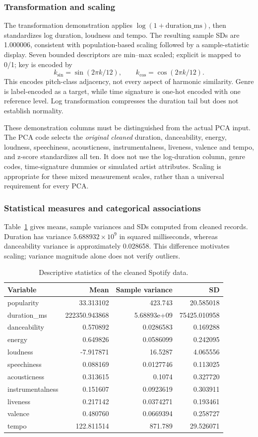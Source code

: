 \documentclass[12pt, a4paper]{article}
\begin{document}
\subsubsection{Transformation and scaling}
The transformation demonstration applies $\log(1+\mathrm{duration\_ms})$, then standardizes log duration, loudness and tempo. The resulting sample SDs are 1.000006, consistent with population-based scaling followed by a sample-statistic display. Seven bounded descriptors are min--max scaled; explicit is mapped to 0/1; key is encoded by
\[
k_{\sin}=\sin(2\pi k/12),\qquad k_{\cos}=\cos(2\pi k/12).
\]
This encodes pitch-class adjacency, not every aspect of harmonic similarity. Genre is label-encoded as a target, while time signature is one-hot encoded with one reference level. Log transformation compresses the duration tail but does not establish normality.

These demonstration columns must be distinguished from the actual PCA input. The PCA code selects the \emph{original cleaned} duration, danceability, energy, loudness, speechiness, acousticness, instrumentalness, liveness, valence and tempo, and z-score standardizes all ten. It does not use the log-duration column, genre codes, time-signature dummies or simulated artist attributes. Scaling is appropriate for these mixed measurement scales, rather than a universal requirement for every PCA.

\subsubsection{Statistical measures and categorical associations}
Table~\ref{tab:spotify-stats} gives means, sample variances and SDs computed from cleaned records. Duration has variance $5.688932\times10^9$ in squared milliseconds, whereas danceability variance is approximately 0.028658. This difference motivates scaling; variance magnitude alone does not verify outliers.
\begin{table}[htbp]
\centering\small
\setlength{\tabcolsep}{4pt}\renewcommand{\arraystretch}{1.12}
\caption{Descriptive statistics of the cleaned Spotify data.}
\label{tab:spotify-stats}
\begin{tabular}{lrrr}
\toprule
\textbf{Variable} & \textbf{Mean} & \textbf{Sample variance} & \textbf{SD} \tabularnewline
\midrule
popularity & 33.313102 & 423.743 & 20.585018 \tabularnewline
duration\_ms & 222350.943868 & 5.68893e+09 & 75425.010958 \tabularnewline
danceability & 0.570892 & 0.0286583 & 0.169288 \tabularnewline
energy & 0.649826 & 0.0586099 & 0.242095 \tabularnewline
loudness & -7.917871 & 16.5287 & 4.065556 \tabularnewline
speechiness & 0.088169 & 0.0127746 & 0.113025 \tabularnewline
acousticness & 0.313615 & 0.1074 & 0.327720 \tabularnewline
instrumentalness & 0.151607 & 0.0923619 & 0.303911 \tabularnewline
liveness & 0.217142 & 0.0374271 & 0.193461 \tabularnewline
valence & 0.480760 & 0.0669394 & 0.258727 \tabularnewline
tempo & 122.811514 & 871.789 & 29.526071 \tabularnewline
\bottomrule
\end{tabular}
\end{table}
\end{document}
